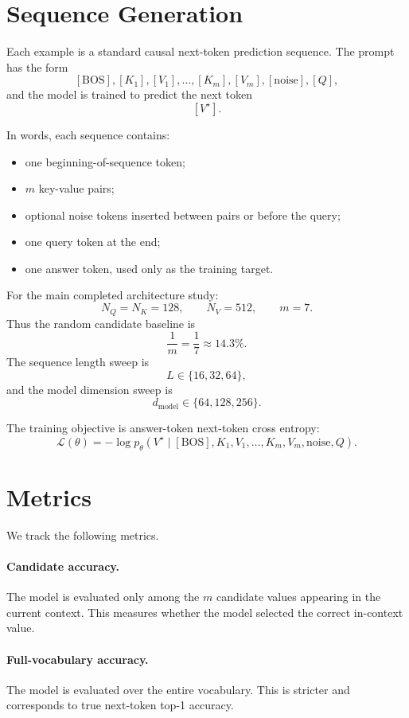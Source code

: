 \documentclass[11pt]{article}
\begin{document}
\section{Sequence Generation}

Each example is a standard causal next-token prediction sequence.
The prompt has the form
\[
[\mathrm{BOS}], [K_1], [V_1], \ldots, [K_m], [V_m], [\mathrm{noise}], [Q],
\]
and the model is trained to predict the next token
\[
[V^\star].
\]

In words, each sequence contains:
\begin{itemize}
  \item one beginning-of-sequence token;
  \item \(m\) key-value pairs;
  \item optional noise tokens inserted between pairs or before the query;
  \item one query token at the end;
  \item one answer token, used only as the training target.
\end{itemize}

For the main completed architecture study:
\[
N_Q=N_K=128,\qquad N_V=512,\qquad m=7.
\]
Thus the random candidate baseline is
\[
\frac{1}{m} = \frac{1}{7} \approx 14.3\%.
\]
The sequence length sweep is
\[
L \in \{16,32,64\},
\]
and the model dimension sweep is
\[
d_{\mathrm{model}} \in \{64,128,256\}.
\]

The training objective is answer-token next-token cross entropy:
\[
\mathcal L(\theta)
=
-\log p_\theta
\left(
V^\star
\mid
[\mathrm{BOS}], K_1,V_1,\ldots,K_m,V_m,\mathrm{noise},Q
\right).
\]

\section{Metrics}

We track the following metrics.

\paragraph{Candidate accuracy.}
The model is evaluated only among the \(m\) candidate values appearing in the current context.
This measures whether the model selected the correct in-context value.

\paragraph{Full-vocabulary accuracy.}
The model is evaluated over the entire vocabulary.
This is stricter and corresponds to true next-token top-1 accuracy.
\end{document}
